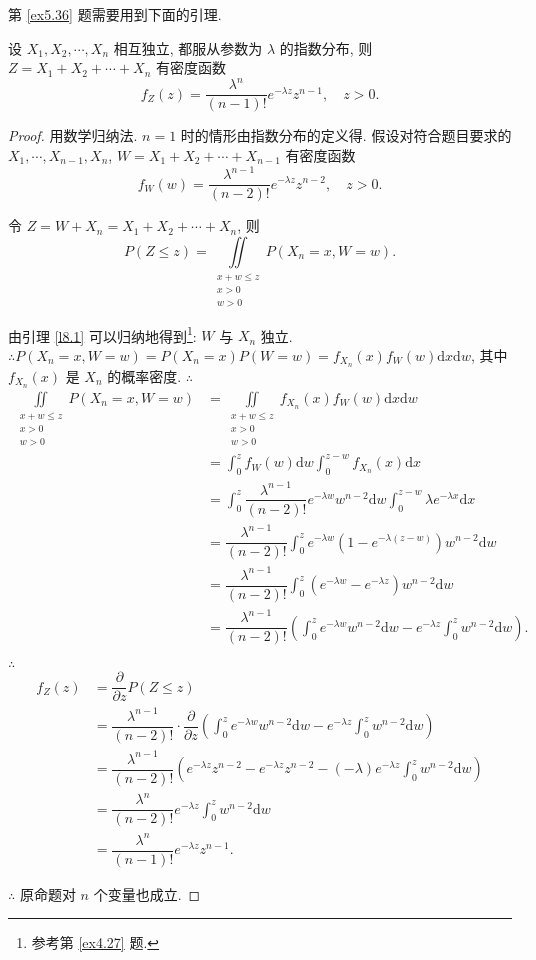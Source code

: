 \documentclass{ctexart}
\begin{document}
第 \ref{ex5.36} 题需要用到下面的引理.
\begin{lemma}\label{l10.1}
    设 $X_1,X_2,\cdots,X_n$ 相互独立, 都服从参数为 $\lambda$ 的指数分布, 则 $Z=X_1+X_2+\cdots+X_n$ 有密度函数
    \[f_Z(z)=\dfrac{\lambda^n}{(n-1)!}e^{-\lambda z}z^{n-1},\quad z>0.\]
\end{lemma}
\begin{proof}
    用数学归纳法. $n=1$ 时的情形由指数分布的定义得. 假设对符合题目要求的 $X_1,\cdots,X_{n-1},X_n$, $W=X_1+X_2+\cdots+X_{n-1}$ 有密度函数
    \[f_W(w)=\dfrac{\lambda^{n-1}}{(n-2)!}e^{-\lambda z}z^{n-2},\quad z>0.\]

    令 $Z=W+X_n=X_1+X_2+\cdots+X_n$, 则
    \[P(Z\leq z)=\iint\limits_{\substack{x+w\leq z\\x>0\\w>0}}P(X_n=x,W=w).\]

    由引理 \ref{l8.1} 可以归纳地得到\footnote{参考第 \ref{ex4.27} 题.}: $W$ 与 $X_n$ 独立. $\therefore P(X_n=x,W=w)=P(X_n=x)P(W=w)=f_{X_n}(x)f_W(w)\mathrm{d}x\mathrm{d}w$, 其中 $f_{X_n}(x)$ 是 $X_n$ 的概率密度. $\therefore$
    \begin{align*}
        \iint\limits_{\substack{x+w\leq z\\x>0\\w>0}}P(X_n=x,W=w) & =\iint\limits_{\substack{x+w\leq z\\x>0\\w>0}}f_{X_n}(x)f_W(w)\mathrm{d}x\mathrm{d}w \\
        & =\int_0^zf_W(w)\mathrm{d}w\int_0^{z-w}f_{X_n}(x)\mathrm{d}x \\
        & =\int_0^z\dfrac{\lambda^{n-1}}{(n-2)!}e^{-\lambda w}w^{n-2}\mathrm{d}w\int_0^{z-w}\lambda e^{-\lambda x}\mathrm{d}x \\
        & =\dfrac{\lambda^{n-1}}{(n-2)!}\int_0^ze^{-\lambda w}(1-e^{-\lambda(z-w)})w^{n-2}\mathrm{d}w \\
        & =\dfrac{\lambda^{n-1}}{(n-2)!}\int_0^z(e^{-\lambda w}-e^{-\lambda z})w^{n-2}\mathrm{d}w \\
        & =\dfrac{\lambda^{n-1}}{(n-2)!}\left(\int_0^ze^{-\lambda w}w^{n-2}\mathrm{d}w-e^{-\lambda z}\int_0^zw^{n-2}\mathrm{d}w\right).
    \end{align*}

    $\therefore$
    \begin{align*}
        f_Z(z) & =\dfrac{\partial}{\partial z}P(Z\leq z) \\
        & =\dfrac{\lambda^{n-1}}{(n-2)!}\cdot\dfrac{\partial}{\partial z}\left(\int_0^ze^{-\lambda w}w^{n-2}\mathrm{d}w-e^{-\lambda z}\int_0^zw^{n-2}\mathrm{d}w\right) \\
        & =\dfrac{\lambda^{n-1}}{(n-2)!}\left(e^{-\lambda z}z^{n-2}-e^{-\lambda z}z^{n-2}-(-\lambda)e^{-\lambda z}\int_0^zw^{n-2}\mathrm{d}w\right) \\
        & =\dfrac{\lambda^n}{(n-2)!}e^{-\lambda z}\int_0^zw^{n-2}\mathrm{d}w \\
        & =\dfrac{\lambda^n}{(n-1)!}e^{-\lambda z}z^{n-1}.
    \end{align*}

    $\therefore$ 原命题对 $n$ 个变量也成立.
\end{proof}
\end{document}
